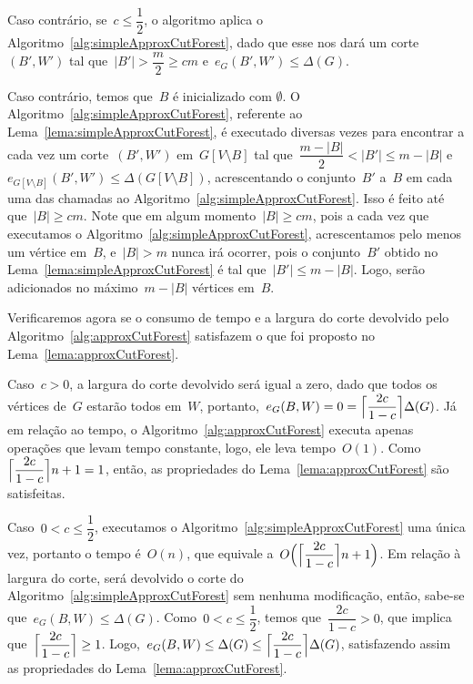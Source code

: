 \documentclass[a4paper,12pt]{article}
\DeclarePairedDelimiter\ceil{\lceil}{\rceil}
\begin{document}
	Caso contrário, se~$c \le \dfrac{1}{2}$, o algoritmo aplica o 
	Algoritmo~\ref{alg:simpleApproxCutForest}, dado que esse 
	nos dará um corte~$(B',W')$ tal 
	que~$|B'|>\dfrac{m}{2}\ge cm$ e~${e_G(B',W')\le \Delta(G)}$.

	Caso contrário, temos que~$B$ é inicializado com $\emptyset$.
	O Algoritmo~\ref{alg:simpleApproxCutForest}, 
	referente ao Lema~\ref{lema:simpleApproxCutForest}, é
	executado diversas vezes para encontrar a cada vez
	um corte~$(B',W')$ em~${G[V\setminus B]}$ 
	tal que~${\dfrac{m-|B|}{2}<|B'|\le m-|B|}$ 
	e~${e_{G[V\setminus B]}(B',W')\le\Delta(G[V\setminus B])}$, 
	acrescentando o 
	conjunto~$B'$ a~$B$ em cada uma das chamadas ao 
	Algoritmo~\ref{alg:simpleApproxCutForest}.
	Isso é feito até que~${|B|\ge cm}$.
	Note que em algum momento~$|B|\ge cm$, pois a 
	cada vez que executamos o 
	Algoritmo~\ref{alg:simpleApproxCutForest}, acrescentamos pelo 
	menos um vértice em~$B$, e~${|B|>m}$ nunca irá ocorrer, pois o 
	conjunto~$B'$ obtido no Lema~\ref{lema:simpleApproxCutForest} 
	é tal que~$|B'|\le m-|B|$. Logo, serão adicionados no 
	máximo~${m-|B|}$ vértices em~$B$.
	
	\bigskip
	\bigskip
	
	Verificaremos agora se o consumo de tempo e a largura do corte
	devolvido pelo Algoritmo~\ref{alg:approxCutForest} satisfazem
	o que foi proposto no Lema~\ref{lema:approxCutForest}.
	
	Caso~$c>0$, a largura do corte devolvido será igual a zero,
	dado que todos os vértices de~$G$ estarão todos em~$W$,
	portanto,~${e_G(B,W)=0=\ceil[\Big]{\dfrac{2c}{1-c}} \Delta(G)}$.
	Já em relação ao tempo, o Algoritmo~\ref{alg:approxCutForest}
	executa apenas operações que levam tempo constante, logo, ele
	leva tempo~$O(1)$. 
	Como~$\ceil[\Big]{\dfrac{2c}{1-c}} n+1 = 1$, então,
	as propriedades do Lema~\ref{lema:approxCutForest} são
	satisfeitas.

	Caso~$0<c\le \dfrac{1}{2}$, executamos o
	Algoritmo~\ref{alg:simpleApproxCutForest} uma única vez, 
	portanto o tempo é~$O(n)$, que equivale 
	a~${O\Big(\ceil[\Big]{\dfrac{2c}{1-c}} n+1\Big)}$.
	Em relação à largura do corte, será devolvido o corte do 
	Algoritmo~\ref{alg:simpleApproxCutForest} sem nenhuma 
	modificação, então, sabe-se que~${e_G(B,W)\le \Delta(G)}$.
	Como~${0<c\le\dfrac{1}{2}}$, temos que~${\dfrac{2c}{1-c}>0}$, 
	que implica que~${\ceil[\Big]{ \dfrac{2c}{1-c}}\ge 1}$.
	Logo,~${e_G(B,W)\le\Delta(G)\le \ceil[\Big]{\dfrac{2c}{1-c}}
	\Delta(G)}$, 
	satisfazendo assim as propriedades do 
	Lema~\ref{lema:approxCutForest}.
\end{document}
